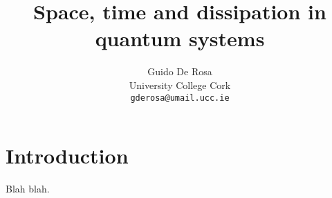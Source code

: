 \documentclass{article}
\title{Space, time and dissipation in quantum systems}
\author{Guido De Rosa\\
  \small{University College Cork}\\
  \small{\texttt{gderosa@umail.ucc.ie}}
}
\begin{document}
\maketitle

\section{Introduction}

Blah blah.
\end{document}

